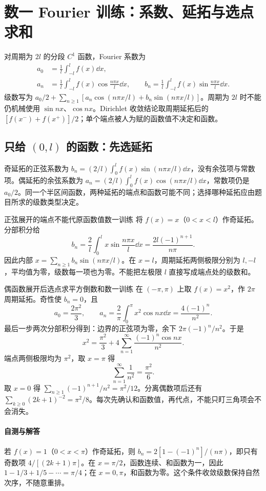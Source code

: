 \section{数一 Fourier 训练：系数、延拓与选点求和}\label{r2:fourier}
对周期为 $2l$ 的分段 $C^1$ 函数，Fourier 系数为
\begin{align*}
 a_0&=\frac1l\int_{-l}^lf(x)\dd x,\\
 a_n&=\frac1l\int_{-l}^lf(x)\cos\frac{n\pi x}{l}\dd x,\qquad
 b_n=\frac1l\int_{-l}^lf(x)\sin\frac{n\pi x}{l}\dd x.
\end{align*}
级数写为 $a_0/2+\sum_{n\ge1}[a_n\cos(n\pi x/l)+b_n\sin(n\pi x/l)]$。周期为 $2l$ 时不能仍机械使用 $\sin nx$、$\cos nx$。Dirichlet 收敛结论取周期延拓后的 $[f(x^-)+f(x^+)]/2$；单个端点被人为赋的函数值不决定和函数。

\subsection{只给 $(0,l)$ 的函数：先选延拓}
奇延拓的正弦系数为 $b_n=(2/l)\int_0^lf(x)\sin(n\pi x/l)\dd x$，没有余弦项与常数项。偶延拓的余弦系数为 $a_n=(2/l)\int_0^lf(x)\cos(n\pi x/l)\dd x$，常数项仍是 $a_0/2$。同一个半区间函数，两种延拓的端点和函数可能不同；选择哪种延拓应由题目所求的级数类型决定。

\begin{example}{正弦展开的端点不能代原函数值}{数一训练}
将 $f(x)=x$（$0<x<l$）作奇延拓。分部积分给
\[
 b_n=\frac2l\int_0^lx\sin\frac{n\pi x}{l}\dd x
 =\frac{2l(-1)^{n+1}}{n\pi}.
\]
因此内部 $x=\sum_{n\ge1}b_n\sin(n\pi x/l)$。在 $x=l$，周期延拓两侧极限分别为 $l,-l$，平均值为零，级数每一项也为零。不能把左极限 $l$ 直接写成端点处的级数和。
\end{example}

\begin{example}{偶函数展开后选点求平方倒数和}{数一训练}
在 $(-\pi,\pi)$ 上取 $f(x)=x^2$，作 $2\pi$ 周期延拓。奇性使 $b_n=0$，且
\[
 a_0=\frac{2\pi^2}{3},\qquad
 a_n=\frac2\pi\int_0^\pi x^2\cos nx\dd x=\frac{4(-1)^n}{n^2}.
\]
最后一步两次分部积分得到：边界的正弦项为零，余下 $2\pi(-1)^n/n^2$。于是
\[
 x^2=\frac{\pi^2}{3}+4\sum_{n=1}^{\infty}\frac{(-1)^n\cos nx}{n^2}.
\]
端点两侧极限均为 $\pi^2$，取 $x=\pi$ 得
\[
 \sum_{n=1}^{\infty}\frac1{n^2}=\frac{\pi^2}{6}.
\]
取 $x=0$ 得 $\sum_{n\ge1}(-1)^{n+1}/n^2=\pi^2/12$。分离偶数项后还有 $\sum_{k\ge0}(2k+1)^{-2}=\pi^2/8$。每次先确认和函数值，再代点，不能只盯三角项会不会消失。
\end{example}

\paragraph{自测与解答}
若 $f(x)=1$（$0<x<\pi$）作奇延拓，则 $b_n=2[1-(-1)^n]/(n\pi)$，即只有奇数项 $4/[(2k+1)\pi]$。在 $x=\pi/2$，函数连续、和函数为一，因此 $1-1/3+1/5-\cdots=\pi/4$；在 $x=0,\pi$，和函数为零。这个条件收敛级数保持自然次序，不随意重排。
